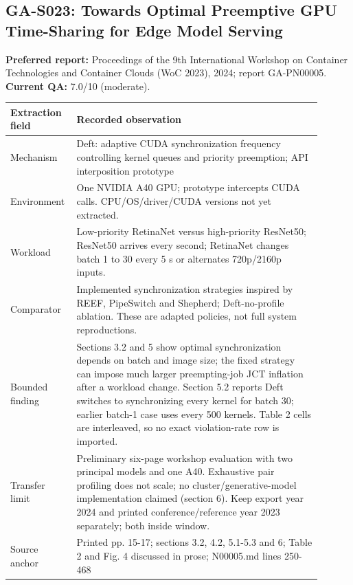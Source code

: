\subsection{GA-S023: Towards Optimal Preemptive GPU Time-Sharing for Edge Model Serving}
\textbf{Preferred report:} Proceedings of the 9th International Workshop on Container Technologies and Container Clouds (WoC 2023), 2024; report GA-PN00005. \textbf{Current QA:} 7.0/10 (moderate).
\begin{longtable}{P{0.15\linewidth}P{0.75\linewidth}}
\toprule Extraction field & Recorded observation\\\midrule\endhead
Mechanism & Deft: adaptive CUDA synchronization frequency controlling kernel queues and priority preemption; API interposition prototype\\
Environment & One NVIDIA A40 GPU; prototype intercepts CUDA calls. CPU/OS/driver/CUDA versions not yet extracted.\\
Workload & Low-priority RetinaNet versus high-priority ResNet50; ResNet50 arrives every second; RetinaNet changes batch 1 to 30 every 5 s or alternates 720p/2160p inputs.\\
Comparator & Implemented synchronization strategies inspired by REEF, PipeSwitch and Shepherd; Deft-no-profile ablation. These are adapted policies, not full system reproductions.\\
Bounded finding & Sections 3.2 and 5 show optimal synchronization depends on batch and image size; the fixed strategy can impose much larger preempting-job JCT inflation after a workload change. Section 5.2 reports Deft switches to synchronizing every kernel for batch 30; earlier batch-1 case uses every 500 kernels. Table 2 cells are interleaved, so no exact violation-rate row is imported.\\
Transfer limit & Preliminary six-page workshop evaluation with two principal models and one A40. Exhaustive pair profiling does not scale; no cluster/generative-model implementation claimed (section 6). Keep export year 2024 and printed conference/reference year 2023 separately; both inside window.\\
Source anchor & Printed pp. 15-17; sections 3.2, 4.2, 5.1-5.3 and 6; Table 2 and Fig. 4 discussed in prose; N00005.md lines 250-468\\
\bottomrule\end{longtable}
